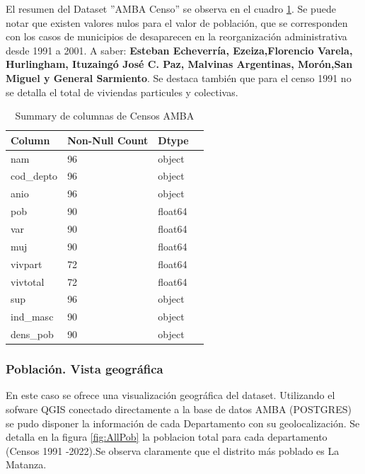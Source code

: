 \documentclass{article}
\theoremstyle{mytheoremstyle}
\theoremstyle{mytheoremstyle}
\theoremstyle{myproblemstyle}
\begin{document}
  El resumen del Dataset ''AMBA Censo'' se observa en el cuadro \ref{tab:summaryCensos}. 
  Se puede notar que existen valores nulos para el valor de población, que se corresponden
   con los casos de municipios de desaparecen en la reorganización administrativa desde 1991 a 2001.
   A saber: \textbf{Esteban Echeverría, Ezeiza,Florencio Varela, Hurlingham, Ituzaingó
   José C. Paz, Malvinas Argentinas, Morón,San Miguel y General Sarmiento}.\newline
    Se destaca también que para el censo 1991 no se detalla el total de viviendas particules y colectivas.\newline

\begin{table}[htb]
    \centering
    \caption{Summary de columnas de Censos AMBA}
    \label{tab:summaryCensos}
    \begin{tabular}{llll}
        \toprule
        \textbf{Column} & \textbf{Non-Null Count} & \textbf{Dtype} \\
        \midrule
        nam & 96 & object \\
        cod\_depto & 96 & object \\
        anio & 96 & object \\
        pob & 90 & float64 \\
        var & 90 & float64 \\
        muj & 90 & float64 \\
        vivpart & 72 & float64 \\
        vivtotal & 72 & float64 \\
        sup & 96 & object \\
        ind\_masc & 90 & object \\
        dens\_pob & 90 & object \\
        \bottomrule
    \end{tabular}
\end{table}

\subsubsection{Población. Vista geográfica}

En este caso se ofrece una visualización geográfica del dataset. Utilizando el sofware QGIS conectado directamente a la base de 
datos AMBA (POSTGRES) se pudo disponer la información de cada Departamento con su geolocalización.
 Se detalla en la figura \ref{fig:AllPob} la poblacion total para cada departamento (Censos 1991 -2022).Se observa claramente que el distrito más poblado 
 es La Matanza.
\end{document}
